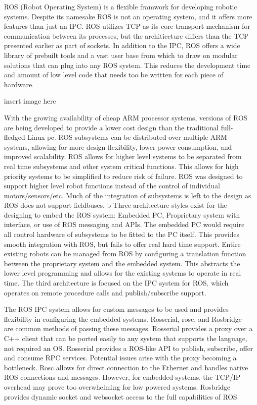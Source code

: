 ROS (Robot Operating System) is a flexible framwork for developing robotic systems. Despite its namesake ROS is not an operating system, and it offers more features than just an IPC. ROS utilizes TCP as its core transport mechanism for communication between its processes, but the architiecture differs than the TCP presented earlier as part of sockets. In addition to the IPC, ROS offers a wide library of prebuilt tools and a vast user base from which to draw on modular solutions that can plug into any ROS system. This reduces the development time and amount of low level code that needs too be written for each piece of hardware.

insert image here

With the growing availability of cheap ARM processor systems, versions of ROS are being developed to provide a lower cost design than the traditional full-fledged Linux pc. ROS subsystems can be distributed over multiple ARM systems, allowing for more design flexibility, lower power consumption, and improved scalability. ROS allows for higher level systems to be separated from real time subsystems and other system critical functions. This allows for high priority systems to be simplified to reduce risk of failure. ROS was designed to support higher level robot functions instead of the control of individual motors/sensors/etc. Much of the integration of subsystems is left to the design as ROS does not support fieldbuses. 
b
Three architecture styles exist for the designing to embed the ROS system: Embedded PC, Proprietary system with interface, or use of ROS messaging and APIs. The embedded PC would require all control hardware of subsystems to be fitted to the PC itself. This provides smooth integration with ROS, but fails to offer real hard time support. Entire existing robots can be managed from ROS by configuring a translation function between the proprietary system and the embedded system. This abstracts the lower level programming and allows for the existing systems to operate in real time. The third architecture is focused on the IPC system for ROS, which operates on remote procedure calls and publish/subscribe support. 

The ROS IPC system allows for custom messages to be used and provides flexibility in configuring the embedded systems. Rosserial, rosc, and Rosbridge are common methods of passing these messages. Rosserial provides a proxy over a C++ client that can be ported easily to any system that supports the language, not required an OS. Rosserial provides a ROS-like API to publish, subscribe, offer and consume RPC services. Potential issues arise with the proxy becoming a bottleneck. Rosc allows for direct connection to the Ethernet and handles native ROS connections and messages. However, for embedded systems, the TCP/IP overhead may prove too overwhelming for low powered systems. Rosbridge provides dynamic socket and websocket access to the full capabilities of ROS


